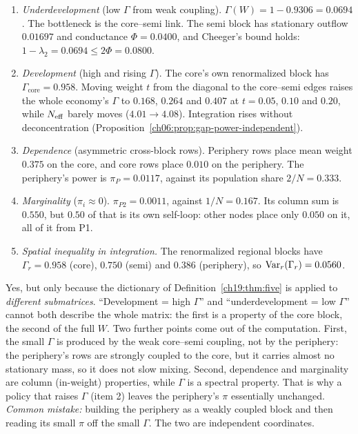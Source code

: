 \documentclass[../solutions_manual.tex]{subfiles}
\begin{document}
\begin{enumerate}
\item \emph{Underdevelopment} (low $\Gamma$ from weak coupling). $\Gamma(W) = 1 - 0.9306 = 0.0694$. The bottleneck is the core--semi link. The semi block has stationary outflow $0.01697$ and conductance $\Phi = 0.0400$, and Cheeger's bound holds: $1 - \lambda_2 = 0.0694 \le 2\Phi = 0.0800$.
\item \emph{Development} (high and rising $\Gamma$). The core's own renormalized block has $\Gamma_{\text{core}} = 0.958$. Moving weight $t$ from the diagonal to the core--semi edges raises the whole economy's $\Gamma$ to $0.168$, $0.264$ and $0.407$ at $t = 0.05$, $0.10$ and $0.20$, while $N_{\text{eff}}$ barely moves ($4.01 \to 4.08$). Integration rises without deconcentration (Proposition~\ref{ch06:prop:gap-power-independent}).
\item \emph{Dependence} (asymmetric cross-block rows). Periphery rows place mean weight $0.375$ on the core, and core rows place $0.010$ on the periphery. The periphery's power is $\pi_P = 0.0117$, against its population share $2/N = 0.333$.
\item \emph{Marginality} ($\pi_i \approx 0$). $\pi_{P2} = 0.0011$, against $1/N = 0.167$. Its column sum is $0.550$, but $0.50$ of that is its own self-loop: other nodes place only $0.050$ on it, all of it from P1.
\item \emph{Spatial inequality in integration.} The renormalized regional blocks have $\Gamma_r = 0.958$ (core), $0.750$ (semi) and $0.386$ (periphery), so $\operatorname{Var}_r(\Gamma_r) = 0.0560$.
\end{enumerate}

 Yes, but only because the dictionary of Definition~\ref{ch19:thm:five} is applied to \emph{different submatrices}. ``Development = high $\Gamma$'' and ``underdevelopment = low $\Gamma$'' cannot both describe the whole matrix: the first is a property of the core block, the second of the full $W$. Two further points come out of the computation. First, the small $\Gamma$ is produced by the weak core--semi coupling, not by the periphery: the periphery's rows are strongly coupled to the core, but it carries almost no stationary mass, so it does not slow mixing. Second, dependence and marginality are column (in-weight) properties, while $\Gamma$ is a spectral property. That is why a policy that raises $\Gamma$ (item 2) leaves the periphery's $\pi$ essentially unchanged. \emph{Common mistake:} building the periphery as a weakly coupled block and then reading its small $\pi$ off the small $\Gamma$. The two are independent coordinates.
\end{document}
